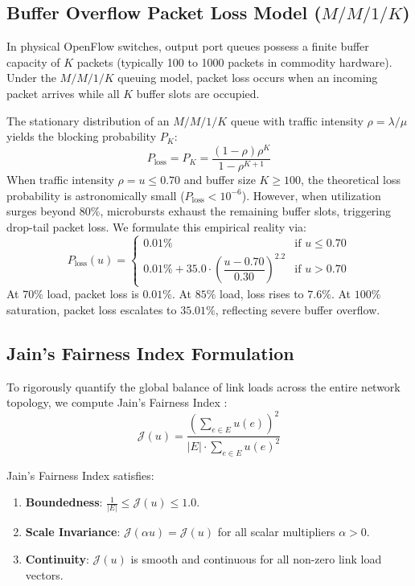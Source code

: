 \subsection{Buffer Overflow Packet Loss Model ($M/M/1/K$)}
In physical OpenFlow switches, output port queues possess a finite buffer capacity of $K$ packets (typically 100 to 1000 packets in commodity hardware). Under the $M/M/1/K$ queuing model, packet loss occurs when an incoming packet arrives while all $K$ buffer slots are occupied.

The stationary distribution of an $M/M/1/K$ queue with traffic intensity $\rho = \lambda / \mu$ yields the blocking probability $P_K$:
\begin{equation}
    P_{\text{loss}} = P_K = \frac{(1 - \rho)\rho^K}{1 - \rho^{K+1}}
\end{equation}
When traffic intensity $\rho = u \le 0.70$ and buffer size $K \ge 100$, the theoretical loss probability is astronomically small ($P_{\text{loss}} < 10^{-6}$). However, when utilization surges beyond $80\%$, microbursts exhaust the remaining buffer slots, triggering drop-tail packet loss. We formulate this empirical reality via:
\begin{equation}
    P_{\text{loss}}(u) = \begin{cases}
        0.01\% & \text{if } u \le 0.70 \\[0.5em]
        0.01\% + 35.0 \cdot \left( \dfrac{u - 0.70}{0.30} \right)^{2.2} & \text{if } u > 0.70
    \end{cases}
    \label{eq:packet_loss_model}
\end{equation}
At $70\%$ load, packet loss is $0.01\%$. At $85\%$ load, loss rises to $7.6\%$. At $100\%$ saturation, packet loss escalates to $35.01\%$, reflecting severe buffer overflow.

\subsection{Jain's Fairness Index Formulation}
To rigorously quantify the global balance of link loads across the entire network topology, we compute Jain's Fairness Index \cite{jain1984quantitative}:
\begin{equation}
    \mathcal{J}(u) = \frac{\left( \sum_{e \in E} u(e) \right)^2}{|E| \cdot \sum_{e \in E} u(e)^2}
    \label{eq:jains_fairness_formula}
\end{equation}

\begin{theorem}
Jain's Fairness Index satisfies:
\begin{enumerate}
    \item \textbf{Boundedness}: $\frac{1}{|E|} \le \mathcal{J}(u) \le 1.0$.
    \item \textbf{Scale Invariance}: $\mathcal{J}(\alpha u) = \mathcal{J}(u)$ for all scalar multipliers $\alpha > 0$.
    \item \textbf{Continuity}: $\mathcal{J}(u)$ is smooth and continuous for all non-zero link load vectors.
\end{enumerate}
\end{theorem}

